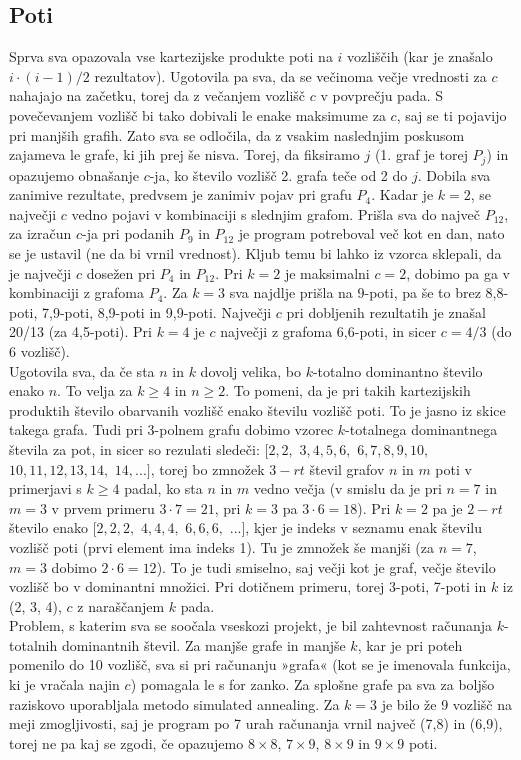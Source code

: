 \documentclass[12pt, a4paper]{article}
\begin{document}
\subsection{Poti}
Sprva sva opazovala vse kartezijske produkte poti na $i$ vozliščih (kar je znašalo $i\cdot(i-1)/2$ rezultatov). Ugotovila pa sva, da se večinoma večje vrednosti za $c$ nahajajo na začetku, torej da z večanjem vozlišč $c$ v povprečju pada. S povečevanjem vozlišč bi tako dobivali le enake maksimume za $c$, saj se ti pojavijo pri manjših grafih. Zato sva se odločila, da z vsakim naslednjim poskusom zajameva le grafe, ki jih prej še nisva. Torej, da fiksiramo $j$ (1. graf je torej $P_j$) in opazujemo obnašanje $c$-ja, ko število vozlišč 2. grafa teče od 2 do $j$. Dobila sva zanimive rezultate, predvsem je zanimiv pojav pri grafu $P_4$. Kadar je $k=2$, se največji $c$ vedno pojavi v kombinaciji s slednjim grafom. Prišla sva do največ $P_{12}$, za izračun $c$-ja pri podanih $P_9$ in $P_{12}$ je program potreboval več kot en dan, nato se je ustavil (ne da bi vrnil vrednost). Kljub temu bi lahko iz vzorca sklepali, da je največji $c$ dosežen pri $P_4$ in $P_{12}$. Pri $k=2$ je maksimalni $c=2$, dobimo pa ga v kombinaciji z grafoma $P_4$. Za $k=3$ sva najdlje prišla na 9-poti, pa še to brez 8,8-poti, 7,9-poti, 8,9-poti in 9,9-poti. Največji $c$ pri dobljenih rezultatih je znašal 20/13 (za 4,5-poti). Pri $k=4$ je $c$ največji z grafoma 6,6-poti, in sicer $c=4/3$ (do 6 vozlišč). \\
Ugotovila sva, da če sta $n$ in $k$ dovolj velika, bo $k$-totalno dominantno število enako $n$. To velja za $k \geq 4$ in $n \geq 2$. To pomeni, da je pri takih kartezijskih produktih število obarvanih vozlišč enako številu vozlišč poti. To je jasno iz skice takega grafa. Tudi pri 3-polnem grafu dobimo vzorec $k$-totalnega dominantnega števila za pot, in sicer so rezulati sledeči: $[2,2,$ $3,4,5,6,$ $6,7,8,9,10,$ $10,11,12,13,14,$ $14, ...]$, torej bo zmnožek $3-rt$ števil grafov $n$ in $m$ poti v primerjavi s $k \geq 4$ padal, ko sta $n$ in $m$ vedno večja (v smislu da je pri $n=7$ in $m=3$ v prvem primeru $3 \cdot 7=21$, pri $k=3$ pa $3 \cdot 6=18$). Pri $k=2$ pa je $2-rt$ število enako $[2,2,2,$ $4,4,4,$ $6,6,6,$ $...]$, kjer je indeks v seznamu enak številu vozlišč poti (prvi element ima indeks 1). Tu je zmnožek še manjši (za $n=7$, $m=3$ dobimo $2 \cdot 6=12$). To je tudi smiselno, saj večji kot je graf, večje število vozlišč bo v dominantni množici. Pri dotičnem primeru, torej 3-poti, 7-poti in $k$ iz (2, 3, 4), $c$ z naraščanjem $k$ pada.\\
Problem, s katerim sva se soočala vseskozi projekt, je bil zahtevnost računanja $k$-totalnih dominantnih števil. Za manjše grafe in manjše $k$, kar je pri poteh pomenilo do 10 vozlišč, sva si pri računanju »grafa« (kot se je imenovala funkcija, ki je vračala najin $c$) pomagala le s for zanko. Za splošne grafe pa sva za boljšo raziskovo uporabljala metodo simulated annealing. Za $k=3$ je bilo že 9 vozlišč na meji zmogljivosti, saj je program po 7 urah računanja vrnil največ (7,8) in (6,9), torej ne pa kaj se zgodi, če opazujemo $8\times8$, $7\times9$, $8\times9$ in $9\times9$ poti. \\
\end{document}
